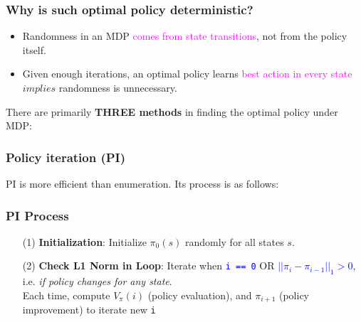 \documentclass{article}
\begin{document}
\begin{hintbox}
    \subsubsection*{Why is such optimal policy deterministic?}
    \begin{prfbox}
        \begin{itemize}
        \item Randomness in an MDP \textcolor{magenta}{comes from state transitions}, not from the policy itself.
        \item Given enough iterations, an optimal policy learns \textcolor{magenta}{best action in every state} $implies$ randomness is unnecessary.
        \end{itemize}
    \end{prfbox}
\end{hintbox}

There are primarily \textbf{THREE methods} in finding the optimal policy under MDP:
\subsubsection{Policy iteration (PI)}
PI is more efficient than enumeration. Its process is as follows:
\begin{thmbox}
  \subsubsection*{PI Process}
  \begin{enumerate}
  \item [(1)] \textbf{Initialization}: Initialize $\pi_0(s)$ randomly for all states $s$.
  \item [(2)] \textbf{Check L1 Norm in Loop}: Iterate when \textcolor{blue}{\texttt{i == 0}} OR \textcolor{blue}{\texttt{$|| \pi_i - \pi_{i-1} ||_{1} > 0$}},
        \\i.e. \textit{if policy changes for any state}.
        \\Each time, compute  $V_\pi(i)$ (policy evaluation), and $\pi_{i+1}$ (policy improvement) to iterate new \texttt{i}
  \end{enumerate}
\end{thmbox}
\end{document}
